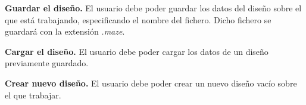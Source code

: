 	\item \textbf{Guardar el diseño.}\newline
		El usuario debe poder guardar los datos del diseño sobre el que está trabajando, especificando el nombre del fichero. Dicho fichero se guardará con la extensión \textit{.maze}.
	\item \textbf{Cargar el diseño.}\newline
		El usuario debe poder cargar los datos de un diseño previamente guardado.
	\item \textbf{Crear nuevo diseño.}\newline
		El usuario debe poder crear un nuevo diseño vacío sobre el que trabajar.
